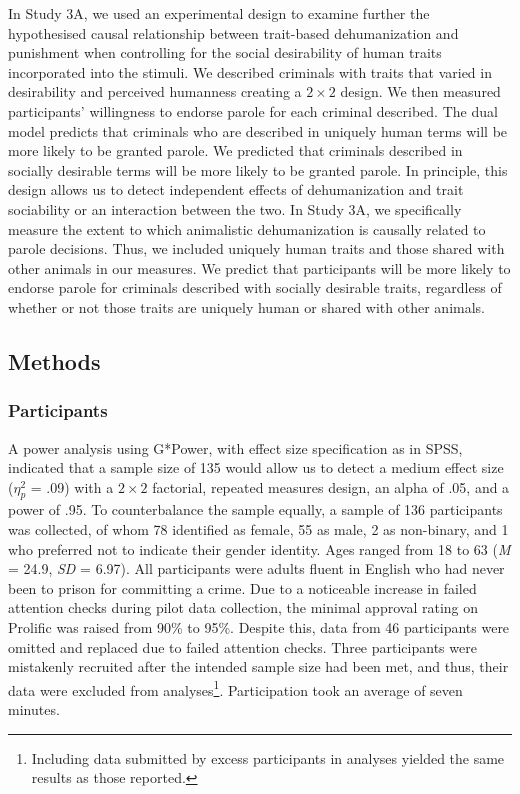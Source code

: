 \documentclass[
]{article}
\begin{document}
In Study 3A, we used an experimental design to examine further the hypothesised causal relationship between trait-based dehumanization and punishment when controlling for the social desirability of human traits incorporated into the stimuli. We described criminals with traits that varied in desirability and perceived humanness creating a \(2 \times 2\) design. We then measured participants' willingness to endorse parole for each criminal described. The dual model predicts that criminals who are described in uniquely human terms will be more likely to be granted parole. We predicted that criminals described in socially desirable terms will be more likely to be granted parole. In principle, this design allows us to detect independent effects of dehumanization and trait sociability or an interaction between the two. In Study 3A, we specifically measure the extent to which animalistic dehumanization is causally related to parole decisions. Thus, we included uniquely human traits and those shared with other animals in our measures. We predict that participants will be more likely to endorse parole for criminals described with socially desirable traits, regardless of whether or not those traits are uniquely human or shared with other animals.

\hypertarget{methods-1}{%
\subsection{Methods}\label{methods-1}}

\hypertarget{participants-4}{%
\subsubsection{Participants}\label{participants-4}}

A power analysis using G*Power, with effect size specification as in SPSS, indicated that a sample size of 135 would allow us to detect a medium effect size (\(\eta_p^2\) = .09) with a \(2 \times 2\) factorial, repeated measures design, an alpha of .05, and a power of .95. To counterbalance the sample equally, a sample of 136 participants was collected, of whom 78 identified as female, 55 as male, 2 as non-binary, and 1 who preferred not to indicate their gender identity. Ages ranged from 18 to 63 (\emph{M} = 24.9, \emph{SD} = 6.97). All participants were adults fluent in English who had never been to prison for committing a crime. Due to a noticeable increase in failed attention checks during pilot data collection, the minimal approval rating on Prolific was raised from 90\% to 95\%. Despite this, data from 46 participants were omitted and replaced due to failed attention checks. Three participants were mistakenly recruited after the intended sample size had been met, and thus, their data were excluded from analyses\footnote{Including data submitted by excess participants in analyses yielded the same results as those reported.}. Participation took an average of seven minutes.
\end{document}

